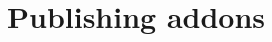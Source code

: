 \documentclass[Orbiter Developer Manual.tex]{subfiles}
\begin{document}
\section{Publishing addons}

\end{document}
